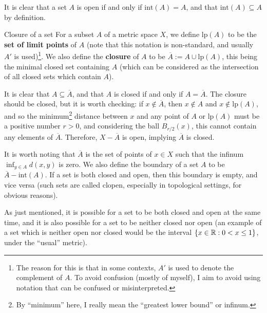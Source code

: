 It is clear that a set $A$ is open if and only if $\text{int}(A) = A$, and that $\text{int}(A) \subseteq A$ by definition.

\begin{bdefin}{Closure of a set}{}
For a subset $A$ of a metric space $X$, we define $\text{lp}(A)$ to be the \textbf{set of limit points} of $A$ (note that this notation is non-standard, and usually $A'$ is used)\footnote{The reason for this is that in some contexts, $A'$ is used to denote the complement of $A$. To avoid confusion (mostly of myself), I aim to avoid using notation that can be confused or misinterpreted.}. We also define the \textbf{closure} of $A$ to be $\overline{A}:= A \cup \text{lp}(A)$, this being the minimal closed set containing $A$ (which can be considered as the intersection of all closed sets which contain $A$).
\end{bdefin}
It is clear that $A \subseteq \overline{A}$, and that $A$ is closed if and only if $A = \overline{A}$. The closure should be closed, but it is worth checking: if $x\not\in \overline{A}$, then $x\not\in A$ and $x \not\in \text{lp}(A)$, and so the minimum\footnote{By “minimum” here, I really mean the “greatest lower bound” or infinum.} distance between $x$ and any point of $A$ or $\text{lp}(A)$ must be a positive number $r>0$, and considering the ball $B_{r/2}(x)$, this cannot contain any elements of $\overline{A}$. Therefore, $X - \overline{A}$ is open, implying $\overline{A}$ is closed.

It is worth noting that $\overline{A}$ is the set of points of $x\in X$ such that the infinum $\inf_{y\in A} d(x,y)$ is zero. We also define the boundary of a set $A$ to be $\overline{A} - \text{int}(A)$. If a set is both closed and open, then this boundary is empty, and vice versa (such sets are called clopen, especially in topological settings, for obvious reasons).

As just mentioned, it is possible for a set to be both closed and open at the same time, and it is also possible for a set to be neither closed nor open (an example of a set which is neither open nor closed would be the interval $\{x\in \mathbb{R} : 0< x \leq 1 \}$, under the “usual” metric).

